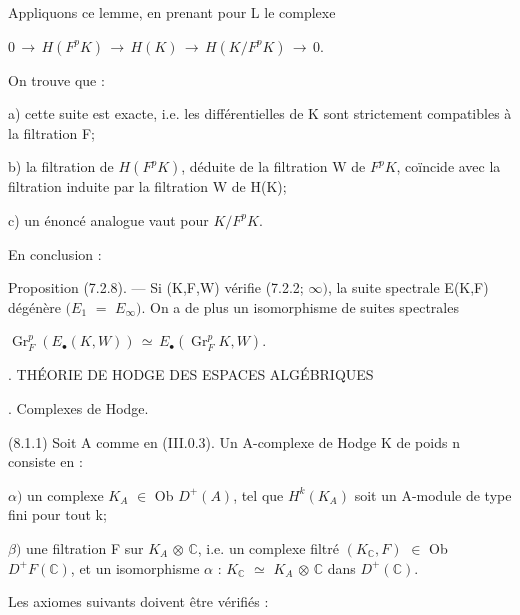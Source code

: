 \documentclass[11pt,twoside]{article}
\newcommand{\DFormula}[1]{%
  \par\smallskip\noindent\hspace*{0pt}\(\displaystyle #1\)\par\smallskip
}
\begin{document}
Appliquons ce lemme, en prenant pour L le complexe\par
\par\medskip
\DFormula{0\,\to \,H(F^{p}K)\,\to \,H(K)\,\to \,H(K/F^{p}K)\,\to \,0.}
\par\medskip
On trouve que :\par
\par\medskip
a) cette suite est exacte, i.e. les différentielles de K sont strictement compatibles à la filtration F;\par
\par\medskip
b) la filtration de \(H(F^{p}K)\), déduite de la filtration W de \(F^{p}K\), coïncide avec la filtration induite par la filtration W de H(K);\par
\par\medskip
c) un énoncé analogue vaut pour \(K/F^{p}K\).\par
\par\medskip
En conclusion :\par
\par\medskip
Proposition (7.2.8). — Si (K,F,W) vérifie (7.2.2; \(\infty )\), la suite spectrale E(K,F) dégénère \((E_{1}\) \(=\) \(E_{\infty })\). On a de plus un isomorphisme de suites spectrales\par
\par\medskip
\DFormula{\operatorname{Gr}_{F}^{p}(E_{\bullet }(K,W))\,\simeq \,E_{\bullet }(\operatorname{Gr}_{F}^{p}K,W).}
\par{}. THÉORIE DE HODGE DES ESPACES ALGÉBRIQUES\par
\par{}. Complexes de Hodge.\par
\par\medskip
(8.1.1) Soit A comme en (III.0.3). Un A-complexe de Hodge K de poids n consiste en :\par
\par\medskip
\(\alpha )\) un complexe \(K_{A}\) \(\in \) Ob \(D^{+}(A)\), tel que \(H^{k}(K_{A})\) soit un A-module de type fini pour tout k;\par
\par\medskip
\(\beta )\) une filtration F sur \(K_{A}\) \(\otimes \) \(\mathbb{C}\), i.e. un complexe filtré \((K_{\mathbb{C}},F)\) \(\in \) Ob \(D^{+}F(\mathbb{C})\), et un isomorphisme \(\alpha \) : \(K_{\mathbb{C}}\) \(\simeq \) \(K_{A}\) \(\otimes \) \(\mathbb{C}\) dans \(D^{+}(\mathbb{C})\).\par
\par\medskip
Les axiomes suivants doivent être vérifiés :\par
\end{document}
